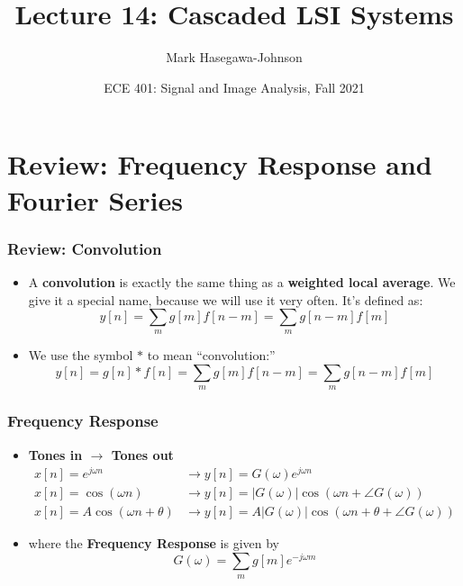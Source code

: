 \documentclass{beamer}
\title{Lecture 14: Cascaded LSI Systems}
\author{Mark Hasegawa-Johnson}
\date{ECE 401: Signal and Image Analysis, Fall 2021}
\begin{document}
\begin{frame}
  \maketitle
\end{frame}

\begin{frame}
  \tableofcontents
\end{frame}

\section[Review]{Review: Frequency Response and Fourier Series}
\setcounter{subsection}{1}

\begin{frame}
  \frametitle{Review: Convolution}
  \begin{itemize}
  \item A {\bf convolution} is exactly the same thing as a {\bf weighted local average}.
    We give it a special name, because we will use it very often.  It's defined as:
    \[
    y[n] = \sum_m g[m] f[n-m] = \sum_m g[n-m] f[m]
    \]
  \item 
    We use the symbol $\ast$ to mean ``convolution:''
    \[
    y[n]=g[n]\ast f[n] = \sum_m g[m] f[n-m] = \sum_m g[n-m] f[m]
    \]
  \end{itemize}
\end{frame}

\begin{frame}
  \frametitle{Frequency Response}
  \begin{itemize}
  \item {\bf Tones in $\rightarrow$ Tones out}
    \begin{align*}
      x[n]=e^{j\omega n} &\rightarrow y[n]=G(\omega)e^{j\omega n}\\
      x[n]=\cos\left(\omega n\right)
      &\rightarrow y[n]=|G(\omega)|\cos\left(\omega n+\angle G(\omega)\right)\\
      x[n]=A\cos\left(\omega n+\theta\right)
      &\rightarrow y[n]=A|G(\omega)|\cos\left(\omega n+\theta+\angle G(\omega)\right)
    \end{align*}
  \item where the {\bf Frequency Response} is given by
    \[
    G(\omega) = \sum_m g[m]e^{-j\omega m}
    \]
  \end{itemize}
\end{frame}
\end{document}
